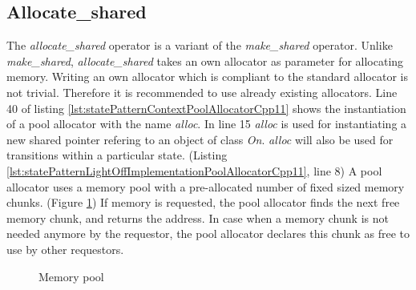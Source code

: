 {%
\subsection{Allocate\_shared}\label{sec:allocateShared}

The \emph{allocate\_shared} operator is a variant of the \emph{make\_shared} operator. Unlike \emph{make\_shared}, \emph{allocate\_shared} takes an own allocator as parameter for allocating memory. Writing an own allocator which is compliant to the standard allocator is not trivial. Therefore it is recommended to use already existing allocators. Line 40 of listing \ref{lst:statePatternContextPoolAllocatorCpp11} shows the instantiation of a pool allocator with the name \emph{alloc}. In line 15 \emph{alloc} is used for instantiating a new shared pointer refering to an object of class \emph{On}. \emph{alloc} will also be used for transitions within a particular state. (Listing \ref{lst:statePatternLightOffImplementationPoolAllocatorCpp11}, line 8) A pool allocator uses a memory pool with a pre-allocated number of fixed sized memory chunks. (Figure \ref{fig:memoryPool}) If memory is requested, the pool allocator finds the next free memory chunk, and returns the address. In case when a memory chunk is not needed anymore by the requestor, the pool allocator declares this chunk as free to use by other requestors.  

\begin{figure}[h]{}
\centering
\mbox{}
\caption{Memory pool}
\label{fig:memoryPool}
\end{figure}

\FloatBarrier



}
